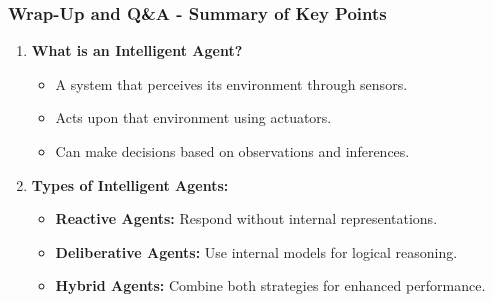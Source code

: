\documentclass[aspectratio=169]{beamer}
\begin{document}
\begin{frame}[fragile]
    \frametitle{Wrap-Up and Q\&A - Summary of Key Points}
    
    \begin{enumerate}
        \item \textbf{What is an Intelligent Agent?}
            \begin{itemize}
                \item A system that perceives its environment through sensors.
                \item Acts upon that environment using actuators.
                \item Can make decisions based on observations and inferences.
            \end{itemize}
        
        \item \textbf{Types of Intelligent Agents:}
            \begin{itemize}
                \item \textbf{Reactive Agents:} Respond without internal representations.
                \item \textbf{Deliberative Agents:} Use internal models for logical reasoning.
                \item \textbf{Hybrid Agents:} Combine both strategies for enhanced performance.
            \end{itemize}  
    \end{enumerate}
\end{frame}
\end{document}
